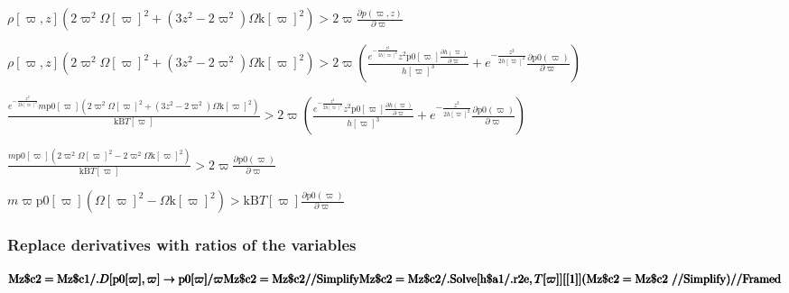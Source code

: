 \documentclass{article}
\begin{document}
\begin{doublespace}
\noindent\(\rho [\varpi ,z] \left(2 \varpi ^2 \Omega [\varpi ]^2+\left(3 z^2-2 \varpi ^2\right) \text{$\Omega $k}[\varpi ]^2\right)>2 \varpi  \frac{\partial
p(\varpi ,z)}{\partial \varpi }\)
\end{doublespace}

\begin{doublespace}
\noindent\(\rho [\varpi ,z] \left(2 \varpi ^2 \Omega [\varpi ]^2+\left(3 z^2-2 \varpi ^2\right) \text{$\Omega $k}[\varpi ]^2\right)>2 \varpi  \left(\frac{e^{-\frac{z^2}{2
h[\varpi ]^2}} z^2 \text{p0}[\varpi ] \frac{\partial h(\varpi )}{\partial \varpi }}{h[\varpi ]^3}+e^{-\frac{z^2}{2 h[\varpi ]^2}} \frac{\partial
\text{p0}(\varpi )}{\partial \varpi }\right)\)
\end{doublespace}

\begin{doublespace}
\noindent\(\frac{e^{-\frac{z^2}{2 h[\varpi ]^2}} m \text{p0}[\varpi ] \left(2 \varpi ^2 \Omega [\varpi ]^2+\left(3 z^2-2 \varpi ^2\right) \text{$\Omega
$k}[\varpi ]^2\right)}{\text{kB} T[\varpi ]}>2 \varpi  \left(\frac{e^{-\frac{z^2}{2 h[\varpi ]^2}} z^2 \text{p0}[\varpi ] \frac{\partial h(\varpi
)}{\partial \varpi }}{h[\varpi ]^3}+e^{-\frac{z^2}{2 h[\varpi ]^2}} \frac{\partial \text{p0}(\varpi )}{\partial \varpi }\right)\)
\end{doublespace}

\begin{doublespace}
\noindent\(\frac{m \text{p0}[\varpi ] \left(2 \varpi ^2 \Omega [\varpi ]^2-2 \varpi ^2 \text{$\Omega $k}[\varpi ]^2\right)}{\text{kB} T[\varpi ]}>2
\varpi  \frac{\partial \text{p0}(\varpi )}{\partial \varpi }\)
\end{doublespace}

\begin{doublespace}
\noindent\(m \varpi  \text{p0}[\varpi ] \left(\Omega [\varpi ]^2-\text{$\Omega $k}[\varpi ]^2\right)>\text{kB} T[\varpi ] \frac{\partial \text{p0}(\varpi
)}{\partial \varpi }\)
\end{doublespace}

\subsubsection*{Replace derivatives with ratios of the variables}

\begin{doublespace}
\noindent\(\pmb{\text{Mz$\$$c2} = \text{Mz$\$$c1} \text{/.} D[\text{p0}[\varpi ],\varpi ]\to  \text{p0}[\varpi ]/\varpi }\\
\pmb{\text{Mz$\$$c2} = \text{Mz$\$$c2} \text{//}\text{Simplify}}\\
\pmb{\text{Mz$\$$c2} = \text{Mz$\$$c2} \text{/.} \text{Solve}[\text{h$\$$a1} \text{/.} \text{r2e}, T[\varpi ]] [[1]]}\\
\pmb{(\text{Mz$\$$c2} = \text{Mz$\$$c2}\text{  }\text{//}\text{Simplify}) \text{//}\text{Framed}}\)
\end{doublespace}
\end{document}
